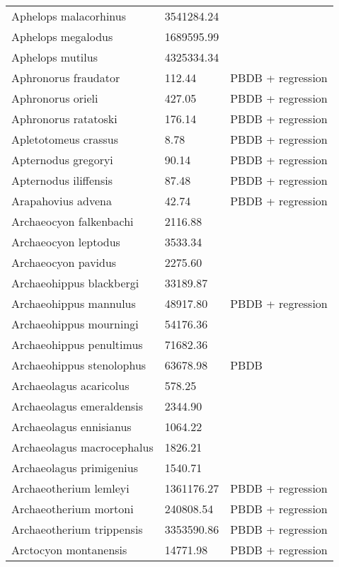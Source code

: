 \begin{center}
\begin{longtable}{p{} p{} p{} }
  Aphelops malacorhinus & 3541284.24 & \cite{Tomiya2013} \\ 
  Aphelops megalodus & 1689595.99 & \cite{Tomiya2013} \\ 
  Aphelops mutilus & 4325334.34 & \cite{Tomiya2013} \\ 
  Aphronorus fraudator & 112.44 & PBDB + regression \\ 
  Aphronorus orieli & 427.05 & PBDB + regression \\ 
  Aphronorus ratatoski & 176.14 & PBDB + regression \\ 
  Apletotomeus crassus & 8.78 & PBDB + regression \\ 
  Apternodus gregoryi & 90.14 & PBDB + regression \\ 
  Apternodus iliffensis & 87.48 & PBDB + regression \\ 
  Arapahovius advena & 42.74 & PBDB + regression \\ 
  Archaeocyon falkenbachi & 2116.88 & \cite{Stirton1932} \\ 
  Archaeocyon leptodus & 3533.34 & \cite{Tomiya2013} \\ 
  Archaeocyon pavidus & 2275.60 & \cite{Tomiya2013} \\ 
  Archaeohippus blackbergi & 33189.87 & \cite{Tomiya2013} \\ 
  Archaeohippus mannulus & 48917.80 & PBDB + regression \\ 
  Archaeohippus mourningi & 54176.36 & \cite{Tomiya2013} \\ 
  Archaeohippus penultimus & 71682.36 & \cite{Tomiya2013} \\ 
  Archaeohippus stenolophus & 63678.98 & PBDB \\ 
  Archaeolagus acaricolus & 578.25 & \cite{Tomiya2013} \\ 
  Archaeolagus emeraldensis & 2344.90 & \cite{Tomiya2013} \\ 
  Archaeolagus ennisianus & 1064.22 & \cite{Tomiya2013} \\ 
  Archaeolagus macrocephalus & 1826.21 & \cite{Tomiya2013} \\ 
  Archaeolagus primigenius & 1540.71 & \cite{Tomiya2013} \\ 
  Archaeotherium lemleyi & 1361176.27 & PBDB + regression \\ 
  Archaeotherium mortoni & 240808.54 & PBDB + regression \\ 
  Archaeotherium trippensis & 3353590.86 & PBDB + regression \\ 
  Arctocyon montanensis & 14771.98 & PBDB + regression \\ 

\end{longtable}
\end{center}
